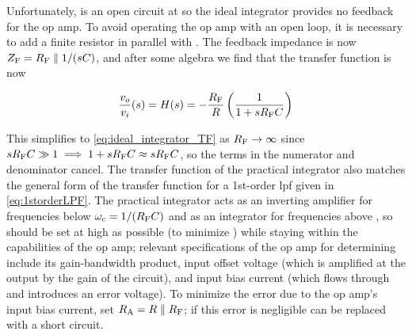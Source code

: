 Unfortunately, \C is an open circuit at \DC so the ideal integrator provides no \DC feedback for the op amp.
To avoid operating the op amp with an open loop, it is necessary to add a finite resistor \R[F] in parallel with \C.
The feedback impedance is now \(\Z[F] = \R[F] \parallel 1/(sC)\), and after some algebra we find that the transfer function is now

\begin{equation}
	\frac{\vout}{\vin}(s) = \Hs = -\frac{\R[F]}{R}\left(\frac{1}{1 + s\R[F]C}\right)
	\label{eq:practical_integrator_TF}
\end{equation}

This simplifies to \eqref{eq:ideal_integrator_TF} as \(\R[F] \to \infty\) since \(s\R[F]C \gg 1 \implies 1 + s\R[F]C \approx s\R[F]C\), so the \R[F] terms in the numerator and denominator cancel.
The transfer function of the practical integrator also matches the general form of the transfer function for a 1st-order \ac{lpf} given in \eqref{eq:1storderLPF}.
The practical integrator acts as an inverting amplifier for frequencies below \(\wcutoff = 1/(\R[F]C)\) and as an integrator for frequencies above \wcutoff, so \R[F] should be set at high as possible (to minimize \wcutoff) while staying within the capabilities of the op amp;
relevant specifications of the op amp for determining \R[F] include its gain-bandwidth product, input offset voltage (which is amplified at the output by the \DC gain of the circuit), and input bias current (which flows through \R[F] and introduces an error voltage).
To minimize the error due to the op amp's input bias current, set \(\R[A] = R \parallel \R[F]\);
if this error is negligible \R[A] can be replaced with a short circuit.

